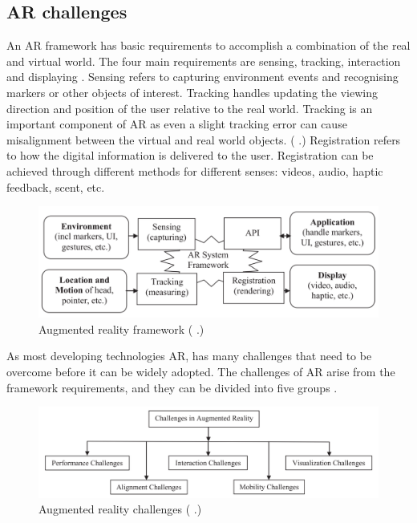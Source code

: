 \documentclass[12pt, a4paper,oneside, nocenter]{thesis}
\renewcommand{\citep}[1]{(\citeauthor{#1} \citeyear{#1}.)}
\begin{document}
\subsection{AR challenges}
An AR framework has basic requirements to accomplish a combination of the real and virtual world.
The four main requirements are sensing, tracking, interaction and displaying . Sensing refers to
capturing environment events and recognising markers or other objects of interest. Tracking handles updating the
viewing direction and position of the user relative to the real world. Tracking is an important component
of AR as even a slight tracking error can cause misalignment between the virtual and real world objects. \citep{ar-design} 
Registration refers to how the digital information is delivered to the user. Registration can be achieved
through different methods for different senses: videos, audio, haptic feedback, scent, etc.
\begin{figure}[H]
\includegraphics[width=\textwidth]{ar-framework}
\caption{Augmented reality framework \citep{vrjournal}}
\label{fig:ar-framework}
\end{figure}
As most developing technologies AR, has many challenges that need to be overcome before it can be widely adopted.
The challenges of AR arise from the framework requirements, and they can be divided into five groups .
\begin{figure}[H]
\includegraphics[width=\textwidth]{ar-challenges}
\caption{Augmented reality challenges \citep{Acta-Graphica}}
\label{fig:ar-challenges}
\end{figure}
\end{document}
